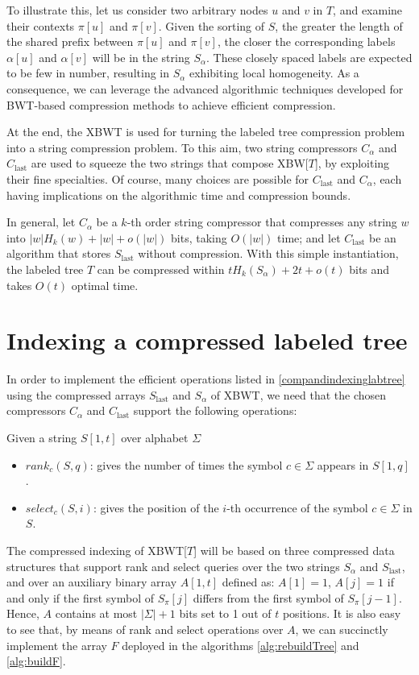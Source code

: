 To illustrate this, let us consider two arbitrary nodes $u$ and $v$ in $T$, and examine their contexts $\pi[u]$ and $\pi[v]$. Given the sorting of $S$, the greater the length of the shared prefix between $\pi[u]$ and $\pi[v]$, the closer the corresponding labels $\alpha[u]$ and $\alpha[v]$ will be in the string $S_{\alpha}$. These closely spaced labels are expected to be few in number, resulting in $S_{\alpha}$ exhibiting local homogeneity. As a consequence, we can leverage the advanced algorithmic techniques developed for BWT-based compression methods to achieve efficient compression.

At the end, the XBWT is used for turning the labeled tree compression problem into a string compression problem. To this aim, two string compressors
$C_{\alpha}$ and $C_{\text{last}}$ are used to squeeze the two strings that compose XBW[$T$], by exploiting their fine specialties. Of course, many choices are possible for $C_{\text{last}}$ and $C_{\alpha}$, each having implications on the algorithmic time and compression bounds.

In general, let $C_{\alpha}$ be a $k$-th order string compressor that compresses any string $w$ into $|w|H_k(w) + |w| + o(|w|)$ bits, taking $O(|w|)$ time; and let $C_{\text{last}}$ be an algorithm that stores $S_{\text{last}}$ without compression. With this simple instantiation, the labeled tree $T$ can be compressed within $t H_k(S_{\alpha}) + 2t + o(t)$ bits and takes $O(t)$ optimal time.

\section{Indexing a compressed labeled tree}
In order to implement the efficient operations listed in \ref{compandindexinglabtree} using the compressed arrays $S_{\text{last}}$ and $S_{\alpha}$ of XBWT, we need that the chosen compressors $C_{\alpha}$ and $C_{\text{last}}$ support the following operations:

Given a string $S[1, t]$ over alphabet $\Sigma$
\begin{itemize}
    \item \textbf{$rank_c(S, q)$}: gives the number of times the symbol $c \in \Sigma$ appears in $S[1, q]$.
    \item \textbf{$select_c(S, i)$}: gives the position of the $i$-th occurrence of the symbol $c \in \Sigma$ in $S$.
\end{itemize}

The compressed indexing of XBWT[$T$] will be based on three compressed data structures that support rank and select queries over the two strings $S_{\alpha}$ and $S_{\text{last}}$, and over an auxiliary binary array $A[1, t]$ defined as: $A[1] = 1$, $A[j] = 1$ if and only if the first symbol of $S_{\pi}[j]$ differs from the first symbol of $S_{\pi}[j - 1]$. Hence, $A$ contains at most $|\Sigma| + 1$ bits set to 1 out of $t$ positions. It is also easy to see that, by means of rank and select operations over $A$, we can succinctly implement the array $F$ deployed in the algorithms \ref{alg:rebuildTree} and \ref{alg:buildF}.

